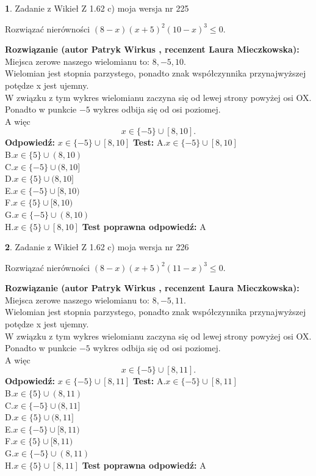 \documentclass[12pt, a4paper]{article}
\theoremstyle{definition} %
\newtheorem{zad}{}
\newcommand{\zadStart}[1]{\begin{zad}#1\newline}
\newcommand{\zadStop}{\end{zad}}
\newcommand{\rozwStart}[2]{\noindent \textbf{Rozwiązanie (autor #1 , recenzent #2): }\newline}
\newcommand{\rozwStop}{\newline}
\newcommand{\odpStart}{\noindent \textbf{Odpowiedź:}\newline}
\newcommand{\odpStop}{\newline}
\newcommand{\testStart}{\noindent \textbf{Test:}\newline}
\newcommand{\testStop}{\newline}
\newcommand{\kluczStart}{\noindent \textbf{Test poprawna odpowiedź:}\newline}
\newcommand{\kluczStop}{\newline}
\begin{document}
\zadStart{Zadanie z Wikieł Z 1.62 c) moja wersja nr 225}

Rozwiązać nierówności $(8-x)(x+5)^{2}(10-x)^{3}\le0$.
\zadStop
\rozwStart{Patryk Wirkus}{Laura Mieczkowska}
Miejsca zerowe naszego wielomianu to: $8, -5, 10$.\\
Wielomian jest stopnia parzystego, ponadto znak współczynnika przy\linebreak najwyższej potędze x jest ujemny.\\ W związku z tym wykres wielomianu zaczyna się od lewej strony powyżej osi OX.\\
Ponadto w punkcie $-5$ wykres odbija się od osi poziomej.\\
A więc $$x \in \{-5\} \cup [8,10].$$
\rozwStop
\odpStart
$x \in \{-5\} \cup [8,10]$
\odpStop
\testStart
A.$x \in \{-5\} \cup [8,10]$\\
B.$x \in \{5\} \cup (8,10)$\\
C.$x \in \{-5\} \cup (8,10]$\\
D.$x \in \{5\} \cup (8,10]$\\
E.$x \in \{-5\} \cup [8,10)$\\
F.$x \in \{5\} \cup [8,10)$\\
G.$x \in \{-5\} \cup (8,10)$\\
H.$x \in \{5\} \cup [8,10]$
\testStop
\kluczStart
A
\kluczStop



\zadStart{Zadanie z Wikieł Z 1.62 c) moja wersja nr 226}

Rozwiązać nierówności $(8-x)(x+5)^{2}(11-x)^{3}\le0$.
\zadStop
\rozwStart{Patryk Wirkus}{Laura Mieczkowska}
Miejsca zerowe naszego wielomianu to: $8, -5, 11$.\\
Wielomian jest stopnia parzystego, ponadto znak współczynnika przy\linebreak najwyższej potędze x jest ujemny.\\ W związku z tym wykres wielomianu zaczyna się od lewej strony powyżej osi OX.\\
Ponadto w punkcie $-5$ wykres odbija się od osi poziomej.\\
A więc $$x \in \{-5\} \cup [8,11].$$
\rozwStop
\odpStart
$x \in \{-5\} \cup [8,11]$
\odpStop
\testStart
A.$x \in \{-5\} \cup [8,11]$\\
B.$x \in \{5\} \cup (8,11)$\\
C.$x \in \{-5\} \cup (8,11]$\\
D.$x \in \{5\} \cup (8,11]$\\
E.$x \in \{-5\} \cup [8,11)$\\
F.$x \in \{5\} \cup [8,11)$\\
G.$x \in \{-5\} \cup (8,11)$\\
H.$x \in \{5\} \cup [8,11]$
\testStop
\kluczStart
A
\kluczStop
\end{document}
